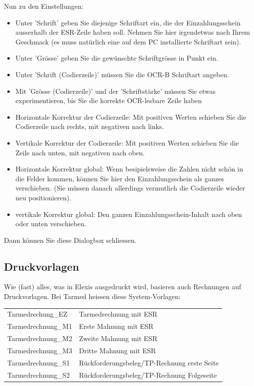 \documentclass[a4paper]{scrartcl}
\begin{document}
Nun zu den Einstellungen:
\begin{itemize}
\item Unter 'Schrift' geben Sie diejenige Schriftart ein, die der Einzahlungsschein ausserhalb der ESR-Zeile haben soll. Nehmen Sie hier irgendetwas nach Ihrem Geschmack (es muss natürlich eine auf dem PC installierte Schriftart sein).
\item Unter 'Grösse' geben Sie die gewünschte Schriftgrösse in Punkt ein.
\item Unter 'Schrift (Codierzeile)' müssen Sie die OCR-B Schriftart angeben.
\item Mit 'Grösse (Codierzeile)' und der 'Schriftstärke' müssen Sie etwas experimentieren, bis Sie die korrekte OCR-lesbare Zeile haben
\item Horizontale Korrektur der Codierzeile: Mit positiven Werten schieben Sie die Codierzeile nach rechts, mit negativen nach links.
\item Vertikale Korrektur der Codierzeile: Mit positiven Werten schieben Sie die Zeile nach unten, mit negativen nach oben.
\item Horizontale Korrektur global: Wenn besipielsweise die Zahlen nicht schön in die Felder kommen, können Sie hier den Einzahlungsschein als ganzes verschieben. (Sie müssen danach allerdings vermutlich die Codierzeile wieder neu positionieren).
\item vertikale Korrektur global: Den ganzen Einzahlungsschein-Inhalt nach oben oder unten verschieben.
\end{itemize}

Dann können Sie diese Dialogbox schliessen.

\subsection{Druckvorlagen}
Wie (fast) alles, was in Elexis ausgedruckt wird, basieren auch Rechnungen auf Druckvorlagen. Bei Tarmed heissen diese System-Vorlagen:

\medskip

\begin{tabular}{|l|l|}
\hline
Tarmedrechung\_EZ & Tarmedrechnung mit ESR\\
Tarmedrechnung\_M1 & Erste Mahnung mit ESR\\
Tarmedrechnung\_M2 & Zweite Mahnung mit ESR\\
Tarmedrechnung\_M3 & Dritte Mahnung mit ESR\\
\hline
Tarmedrechnung\_S1 & Rückforderungsbeleg/TP-Rechnung erste Seite\\
Tarmedrechnung\_S2 & Rückforderungsbeleg/TP-Rechnung Folgeseite\\
\hline

\end{tabular}
\end{document}
